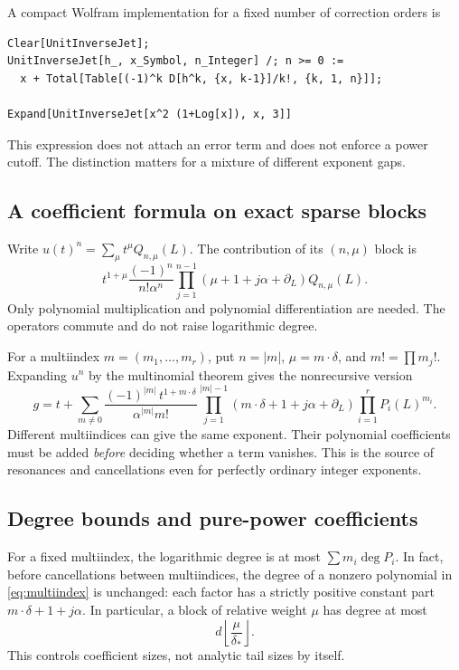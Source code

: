 \documentclass[11pt,a4paper]{article}
\numberwithin{equation}{section}
\theoremstyle{definition}\newtheorem{definition}[theorem]{Definition}
\theoremstyle{remark}\newtheorem{remark}[theorem]{Remark}
\begin{document}
A compact Wolfram implementation for a fixed number of correction orders is
\begin{lstlisting}
Clear[UnitInverseJet];
UnitInverseJet[h_, x_Symbol, n_Integer] /; n >= 0 :=
  x + Total[Table[(-1)^k D[h^k, {x, k-1}]/k!, {k, 1, n}]];

Expand[UnitInverseJet[x^2 (1+Log[x]), x, 3]]
\end{lstlisting}
This expression does not attach an error term and does not enforce a power
cutoff. The distinction matters for a mixture of different exponent gaps.

\subsection{A coefficient formula on exact sparse blocks}
Write
\(u(t)^n=\sum_\mu t^\mu Q_{n,\mu}(L)\).
The contribution of its \((n,\mu)\) block is
\begin{equation}\label{eq:block-coefficient}
 t^{1+\mu}\frac{(-1)^n}{n!\alpha^n}
 \prod_{j=1}^{n-1}\left(\mu+1+j\alpha+\partial_L\right)Q_{n,\mu}(L).
\end{equation}
Only polynomial multiplication and polynomial differentiation are needed.
The operators commute and do not raise logarithmic degree.

For a multiindex \(m=(m_1,\ldots,m_r)\), put
\(n=|m|\), \(\mu=m\cdot\delta\), and \(m!=\prod m_j!\). Expanding
\(u^n\) by the multinomial theorem gives the nonrecursive version
\begin{equation}\label{eq:multiindex}
 g=t+\sum_{m\ne0}
 \frac{(-1)^{|m|}\,t^{1+m\cdot\delta}}{\alpha^{|m|}m!}
 \prod_{j=1}^{|m|-1}
 \left(m\cdot\delta+1+j\alpha+\partial_L\right)
 \prod_{i=1}^r P_i(L)^{m_i}.
\end{equation}
Different multiindices can give the same exponent. Their polynomial
coefficients must be added \emph{before} deciding whether a term vanishes.
This is the source of resonances and cancellations even for perfectly
ordinary integer exponents.

\subsection{Degree bounds and pure-power coefficients}
For a fixed multiindex, the logarithmic degree is at most
\(\sum m_i\deg P_i\). In fact, before cancellations between multiindices,
the degree of a nonzero polynomial in \eqref{eq:multiindex} is unchanged:
each factor has a strictly positive constant part
\(m\cdot\delta+1+j\alpha\).
In particular, a block of relative weight \(\mu\) has degree at most
\begin{equation}\label{eq:degree-bound}
 d\left\lfloor\frac\mu{\delta_*}\right\rfloor.
\end{equation}
This controls coefficient sizes, not analytic tail sizes by itself.
\end{document}
